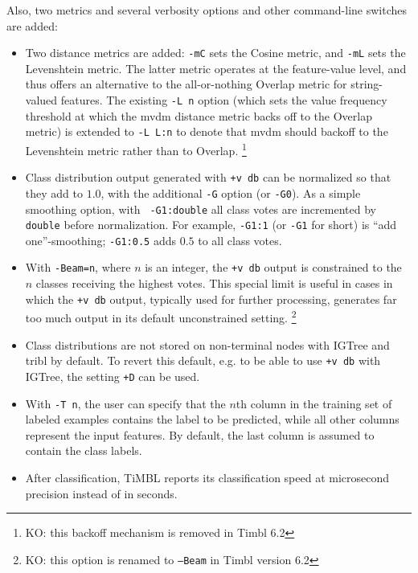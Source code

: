 \documentclass{report}
\begin{document}
Also, two metrics and several verbosity options and other command-line
switches are added:

\begin{itemize}

\item Two distance metrics are added: {\tt -mC} sets the Cosine
  metric, and {\tt -mL} sets the Levenshtein metric. The latter metric
  operates at the feature-value level, and thus offers an alternative
  to the all-or-nothing Overlap metric for string-valued features. The
  existing {\tt -L n} option (which sets the value frequency threshold
  at which the {\sc mvdm} distance metric backs off to the Overlap
  metric) is extended to {\tt -L L:n} to denote that {\sc mvdm} should
  backoff to the Levenshtein metric rather than to Overlap. \footnote{KO: this backoff mechanism is removed in Timbl 6.2}

\item Class distribution output generated with {\tt +v db} can be
  normalized so that they add to $1.0$, with the additional {\tt -G}
  option (or {\tt -G0}). As a simple smoothing option, with {\tt
    -G1:double} all class votes are incremented by {\tt double} before
  normalization.  For example, {\tt -G1:1} (or {\tt -G1} for short) is
  ``add one''-smoothing; {\tt -G1:0.5} adds $0.5$ to all class votes.

\item With {\tt -Beam=n}, where $n$ is an integer, the {\tt +v db}
  output is constrained to the $n$ classes receiving the highest
  votes. This special limit is useful in cases in which the {\tt +v
    db} output, typically used for further processing, generates far
  too much output in its default unconstrained setting. \footnote{KO: this option is renamed to {\tt --Beam} in Timbl version 6.2}

\item Class distributions are not stored on non-terminal nodes with
  {\sc IGTree} and {\sc tribl} by default. To revert this default,
  e.g. to be able to use {\tt +v db} with {\sc IGTree}, the setting
  {\tt +D} can be used.

\item With {\tt -T n}, the user can specify that the $n$th column in
  the training set of labeled examples contains the label to be
  predicted, while all other columns represent the input features. By
  default, the last column is assumed to contain the class labels.

\item After classification, TiMBL reports its classification speed at
  microsecond precision instead of in seconds.


\end{itemize}
\end{document}

